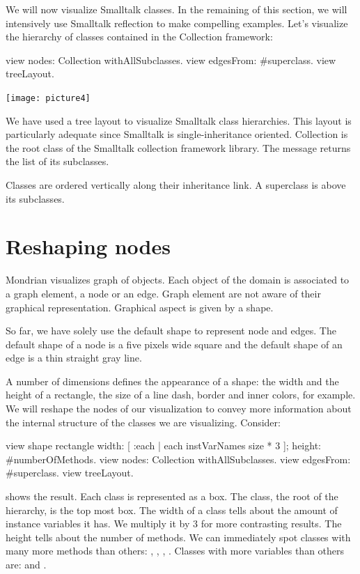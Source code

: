 \documentclass[a4paper,10pt,twoside]{book}
\begin{document}
We will now visualize Smalltalk classes. In the remaining of this section, we will intensively use Smalltalk reflection to make compelling examples. Let's visualize the hierarchy of classes contained in the Collection framework:

\begin{code}{}
view nodes: Collection withAllSubclasses.
view edgesFrom: #superclass.
view treeLayout.
\end{code}
\begin{center}\texttt{[image: picture4]}\end{center}


We have used a tree layout to visualize Smalltalk class hierarchies. This layout is particularly adequate since Smalltalk is single-inheritance oriented. Collection is the root class of the Smalltalk collection framework library. The message  returns the list of its subclasses.

Classes are ordered vertically along their inheritance link. A superclass is above its subclasses. 


\section{Reshaping nodes}

Mondrian visualizes graph of objects. Each object of the domain is associated to a graph element, a node or an edge. Graph element are not aware of their graphical representation. Graphical aspect is given by a shape. 

So far, we have solely use the default shape to represent node and edges. The default shape of a node is a five pixels wide square and the default shape of an edge is a thin straight gray line.

A number of dimensions defines the appearance of a shape: the width and the height of a rectangle, the size of a line dash, border and inner colors, for example. We will reshape the nodes of our visualization to convey more information about the internal structure of the classes we are visualizing. Consider:

\begin{code}{}
view shape rectangle
	width: [ :each | each instVarNames size * 3 ];
	height: #numberOfMethods.
view nodes: Collection withAllSubclasses.
view edgesFrom: #superclass.
view treeLayout.
\end{code}

 shows the result. Each class is represented as a box. The  class, the root of the hierarchy, is the top most box. The width of a class tells about the amount of instance variables it has. We multiply it by 3 for more contrasting results. The height tells about the number of methods. We can immediately spot classes with many more methods than others: , , , . Classes with more variables than others are:  and .
\end{document}
